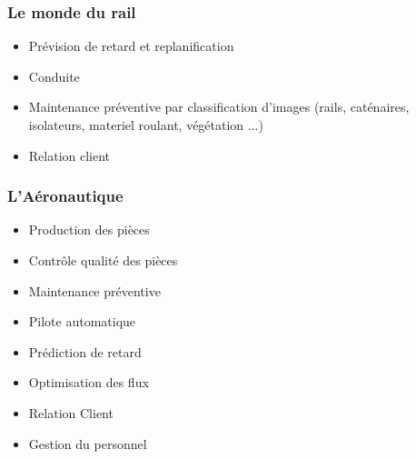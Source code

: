 \documentclass{formation}
\begin{document}
\begin{frame}
  \frametitle{Le monde du rail}
  \begin{itemize}
  \item Prévision de retard et replanification
  \item Conduite
  \item Maintenance préventive par classification d'images (rails, caténaires, isolateurs, materiel roulant, végétation ...)
  \item Relation client
  \end{itemize}
\end{frame}

\begin{frame}
  \frametitle{L'Aéronautique}
  \begin{minipage}[c]{0.49\linewidth}
    \begin{itemize}
    \item Production des pièces
    \item Contrôle qualité des pièces
    \item Maintenance préventive
    \item Pilote automatique
    \item Prédiction de retard
    \item Optimisation des flux
    \item Relation Client
    \item Gestion du personnel
    \end{itemize}
  \end{minipage}\hfill
  \begin{minipage}[c]{0.49\linewidth}
  \end{minipage}\hfill
\end{frame}
\end{document}
